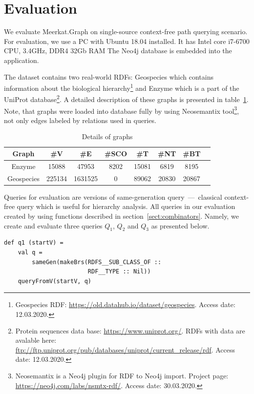 \section{Evaluation}

We evaluate Meerkat.Graph on single-source context-free path querying scenario.
For evaluation, we use a PC with Ubuntu 18.04 installed.
It has Intel core i7-6700 CPU, 3.4GHz, DDR4 32Gb RAM
The Neo4j database is embedded into the application.

The dataset contains two real-world RDFs: Geospecies which contains information about the biological hierarchy\footnote{Geospecies RDF: \url{https://old.datahub.io/dataset/geospecies}. Access date: 12.03.2020.} and Enzyme which is a part of the UniProt database\footnote{Protein sequences data base: \url{https://www.uniprot.org/}. RDFs with data are avalable here: \url{ftp://ftp.uniprot.org/pub/databases/uniprot/current_release/rdf}. Access date: 12.03.2020.}.
A detailed description of these graphs is presented in table~\ref{tbl:datasetDetails}.
Note, that graphs were loaded into database fully by using Neosemantix tool\footnote{Neosemantix is a Neo4j plugin for RDF to Neo4j import. Project page: \url{https://neo4j.com/labs/nsmtx-rdf/}. Access date: 30.03.2020.}, not only edges labeled by relations used in queries.

{
\setlength{\tabcolsep}{4pt}
\begin{table}[ht]
\begin{tabular}{|c|c|c|c|c|c|c|c|}
\hline
 Graph      & \#V & \#E & \#SCO & \#T & \#NT & \#BT \\
 \hline
 Enzyme     & 15088  & 47953   & 8202 & 15081 & 6819  & 8195 \\
 Geospecies & 225134 & 1631525 & 0    & 89062 & 20830 & 20867 \\
 \hline
\end{tabular}
\caption{Details of graphs}
\label{tbl:datasetDetails}
\end{table}
}

Queries for evaluation are versions of same-generation query~---~classical context-free query which is useful for hierarchy analysis.
All queries in our evaluation created by using functions described in section~\ref{sect:combinators}. Namely, we create and evaluate three queries $Q_1$, $Q_2$ and $Q_3$ as presented below.

\begin{lstlisting}
def q1 (startV) =
    val q =
        sameGen(makeBrs(RDFS__SUB_CLASS_OF ::
                        RDF__TYPE :: Nil))
    queryFromV(startV, q)
\end{lstlisting}

